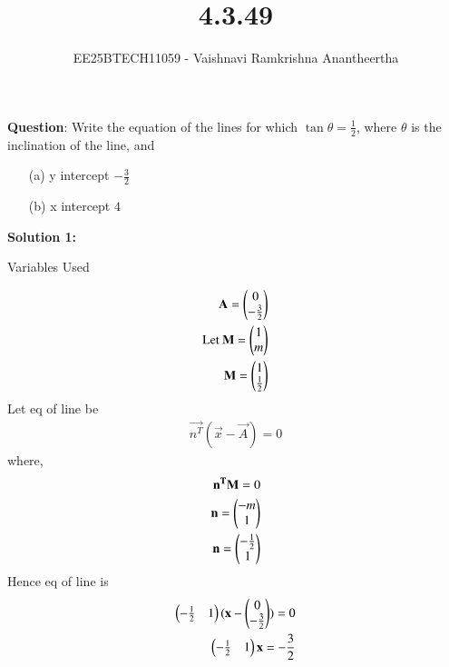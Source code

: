 \documentclass[journal]{IEEEtran}
\title{4.3.49}
\author{EE25BTECH11059 - Vaishnavi Ramkrishna Anantheertha}
\begin{document}
\maketitle

\renewcommand{\thefigure}{\theenumi}
\renewcommand{\thetable}{\theenumi}


\textbf{Question}:
Write the equation of the lines for which $\tan\theta = \frac{1}{2}$, where $\theta$ is the inclination of the line, and
\begin{enumerate}
\item[(a)] y intercept $- \frac{3}{2}$
\item[(b)] x intercept $4$
\end{enumerate}
\textbf{Solution 1: }
\begin{table}[H]    
  \centering
  
  \caption{Variables Used}
  \label{tab:4.3.49}
\end{table}
\begin{align}
\mathbf{A}=\begin{pmatrix}
                0
                \\
                 -\frac{3}{2}  \end{pmatrix}\\
\text{Let }\mathbf{M}=\begin{pmatrix}
                           1
                           \\
                            m
                            \end{pmatrix}\\
            \mathbf{M}=\begin{pmatrix}
                           1
                           \\
                            \frac{1}{2}
                            \end{pmatrix}
\end{align}
Let eq of line be
\begin{align}
\vec{n^T}(\vec{x}-\vec{A})=0
\end{align}
where,
\begin{align}
\mathbf{n^T}\mathbf{M}=0\\
\mathbf{n}=\begin{pmatrix}-m
               \\
               1\end{pmatrix}\\
\mathbf{n}=\begin{pmatrix}-\frac{1}{2}
                \\
                1\end{pmatrix}
\end{align}
Hence eq of line is
\begin{align}
\begin{pmatrix}-\frac{1}{2}&1\end{pmatrix}
(\mathbf{x}-    
\begin{pmatrix}
           0
           \\
            -\frac{3}{2}
               \end{pmatrix}   )
=0\\
\begin{pmatrix}-\frac{1}{2}&1\end{pmatrix}\mathbf{x}
=-\frac{3}{2}
\end{align}
\end{document}
